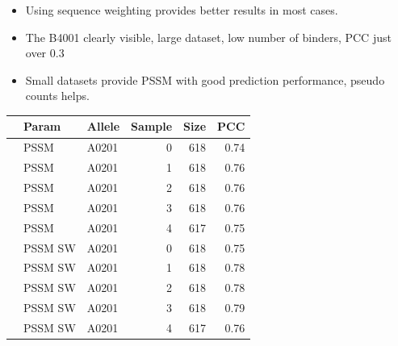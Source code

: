 \documentclass[presentation]{beamer}   %
\begin{document}
\begin{frame} 
\begin{itemize}
\item<1> Using sequence weighting provides better results in most cases.
\item<2> The B4001 clearly visible, large dataset, low number of binders, PCC just over 0.3
\item<3> Small datasets provide PSSM with good prediction performance, pseudo counts helps.
\end{itemize}
\end{frame}

\begin{frame}

\begin{table}\scriptsize

\begin{center}


\begin{tabular}{rllrrr}
  \hline
 & Param & Allele & Sample & Size & PCC \\ 
  \hline
 & PSSM & A0201 &   0 & 618 & 0.74 \\ 
 & PSSM & A0201 &   1 & 618 & 0.76 \\ 
 & PSSM & A0201 &   2 & 618 & 0.76 \\ 
 & PSSM & A0201 &   3 & 618 & 0.76 \\ 
 & PSSM & A0201 &   4 & 617 & 0.75 \\ 
\hline
 & PSSM SW & A0201 &   0 & 618 & 0.75 \\ 
 & PSSM SW & A0201 &   1 & 618 & 0.78 \\ 
 & PSSM SW & A0201 &   2 & 618 & 0.78 \\ 
 & PSSM SW & A0201 &   3 & 618 & 0.79 \\ 
 & PSSM SW & A0201 &   4 & 617 & 0.76 \\ 
   \hline
\end{tabular}

\end{center}
\end{table}
\end{frame}
\end{document}
